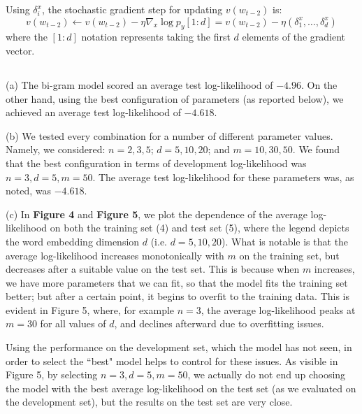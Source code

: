 \documentclass[psamsfonts]{amsart}
\theoremstyle{definition}
\theoremstyle{remark}
\numberwithin{equation}{section}
\begin{document}
Using $\delta_i^x$, the stochastic gradient step for updating $v(w_{t-2})$ is:
$$v(w_{t-2}) \leftarrow v(w_{t-2}) - \eta \nabla_{x} \log p_y[1:d] = v(w_{t-2}) - \eta (\delta_1^x, \dots, \delta_d^x)$$
where the $[1:d]$ notation represents taking the first $d$ elements of the gradient vector. 

\subsection{} (a) The bi-gram model scored an average test log-likelihood of $-4.96$. On the other hand, using the best configuration of parameters (as reported below), we achieved an average test log-likelihood of $-4.618$.

(b) We tested every combination for a number of different parameter values. Namely, we considered: $n = 2, 3, 5$; $d = 5, 10, 20$; and $m = 10, 30, 50$. We found that the best configuration in terms of development log-likelihood was $n=3, d = 5, m = 50$. The average test log-likelihood for these parameters was, as noted, was $-4.618$.

(c) In {\bf Figure 4} and {\bf Figure 5}, we plot the dependence of the average log-likelihood on both the training set (4) and test set (5), where the legend depicts the word embedding dimension $d$ (i.e. $d = 5, 10, 20$). What is notable is that the average log-likelihood increases monotonically with $m$ on the training set, but decreases after a suitable value on the test set. This is because when $m$ increases, we have more parameters that we can fit, so that the model fits the training set better; but after a certain point, it begins to overfit to the training data. This is evident in Figure 5, where, for example $n = 3$, the average log-likelihood peaks at $ m = 30$ for all values of $d$, and declines afterward due to overfitting issues.

Using the performance on the development set, which the model has not seen, in order to select the ``best" model helps to control for these issues. As visible in Figure 5, by selecting $n=3, d= 5, m = 50$, we actually do not end up choosing the model with the best average log-likelihood on the test set (as we evaluated on the development set), but the results on the test set are very close.
\end{document}
